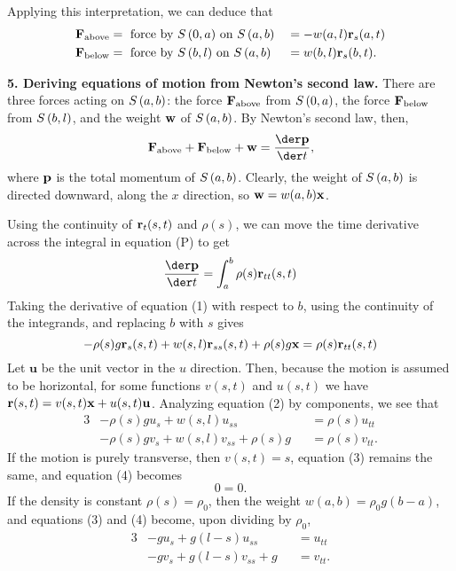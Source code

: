 \documentclass{homework}
\begin{document}
Applying this interpretation, we can deduce that 
\begin{alignat*}{3}
	\mathbf{F}_{\text{above}} &= \text { force by } {S\left({0}, {a}\right)} \text{ on } {S\left({a}, {b}\right)} &&=-w(a, l)\mathbf{r}_s(a, t) \\
	\mathbf{F}_{\text{below}} &= \text { force by } {S\left({b}, {l}\right)} \text { on } {S\left({a}, {b}\right)} &&= w(b, l)\mathbf{r}_s(b, t).
\end{alignat*}

\textbf{5. Deriving equations of motion from Newton's second law.}
There are three forces acting on \({S\left({a}, {b}\right)}\): the force \(\mathbf{F}_{\text{above}}\) from \({S\left({0}, {a}\right)}\), the force \(\mathbf{F}_{\text{below}}\) from \({S\left({b}, {l}\right)}\), and the weight \(\mathbf{w}\) of \({S\left({a}, {b}\right)}\). By Newton's second law, then,
\begin{equation}
	\forceabove + \forcebelow + \forcegravity = \frac{\der \momentum}{\der t},
\end{equation}
where \(\mathbf{p}\) is the total momentum of \({S\left({a}, {b}\right)}\). Clearly, the weight of \({S\left({a}, {b}\right)}\) is directed downward, along the \(x\) direction, so \(\mathbf{w} = w(a, b)\mathbf{x}\).

Using the continuity of \(\mathbf{r}_t(s, t)\) and \(\rho(s)\), we can move the time derivative across the integral in equation (P) to get
\begin{equation*}
	\frac{\der \momentum}{\der t} = \int_a^b \rho(s)\pos_{tt}(s, t)
\end{equation*}
Taking the derivative of equation (1) with respect to \(b\), using the continuity of the integrands, and replacing \(b\) with \(s\) gives
\begin{equation}
	-\rho(s)g\mathbf{r}_s(s, t) + w(s, l)\mathbf{r}_{ss}(s, t) + \rho(s)g\mathbf{x} = \rho(s)\mathbf{r}_{tt}(s, t)
\end{equation}
Let \(\mathbf{u}\) be the unit vector in the \(u\) direction. Then, because the motion is assumed to be horizontal, for some functions \(v(s, t)\) and \(u(s, t)\) we have
\(\mathbf{r}(s, t) = v(s, t)\mathbf{x} + u(s, t)\mathbf{u}\). Analyzing equation (2) by components, we see that
\begin{alignat}{3}
	&-\rho(s)gu_s + w(s, l)u_{ss} &&= \rho(s)u_{tt} \\
	&-\rho(s)gv_s + w(s, l)v_{ss}  + \rho(s)g &&= \rho(s)v_{tt}.
\end{alignat}
If the motion is purely transverse, then \(v(s, t) = s\), equation (3) remains the same, and equation (4) becomes
\begin{equation*}
	\tag{4?}
	0 = 0.
\end{equation*}
If the density is constant \(\rho(s) = \rho_0\), then the weight \(w(a, b) = \rho_0g(b-a)\), and equations (3) and (4) become, upon dividing by \(\rho_0\),
\begin{alignat*}{3}
	&-gu_s + g(l - s)u_{ss} &&= u_{tt} \tag{\(3'\)} \\ 
	&-gv_s + g(l - s)v_{ss} + g &&= v_{tt} \tag{\(4'\)}.
\end{alignat*}
\end{document}
